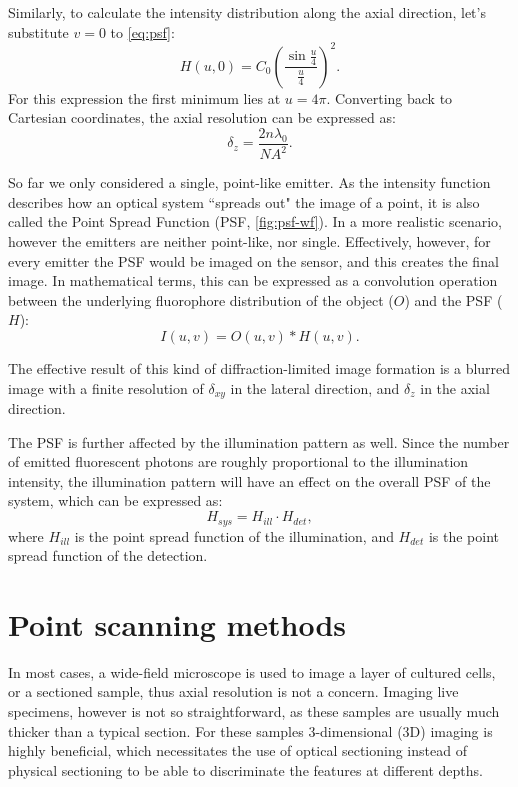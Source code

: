     Similarly, to calculate the intensity distribution along the axial direction, let's substitute $v=0$ to \autoref{eq:psf}:
    \begin{equation}
      H(u,0)=C_0\left( \frac{\sin \frac{u}{4}}{\frac{u}{4}}\right) ^2 . 
    \end{equation} 
    For this expression the first minimum lies at $u=4\pi$. Converting back to Cartesian coordinates, the axial resolution can be expressed as:
    \begin{equation}
      \delta_z = \frac{2n\lambda_0}{NA^2}.
      \label{eq:axialRes}
    \end{equation}

    So far we only considered a single, point-like emitter. As the intensity function describes how an optical system ``spreads out" the image of a point, it is also called the Point Spread Function (PSF, \autoref{fig:psf-wf}). In a more realistic scenario, however the emitters are neither point-like, nor single. Effectively, however, for every emitter the PSF would be imaged on the sensor, and this creates the final image. In mathematical terms, this can be expressed as a convolution operation between the underlying fluorophore distribution of the object ($O$) and the PSF ($H$):
    \begin{equation}
      I(u,v) = O(u,v) * H(u,v).
    \end{equation}

    The effective result of this kind of diffraction-limited image formation is a blurred image with a finite resolution of $\delta_{xy}$ in the lateral direction, and $\delta_z$ in the axial direction.

    The PSF is further affected by the illumination pattern as well. Since the number of emitted fluorescent photons are roughly proportional to the illumination intensity, the illumination pattern will have an effect on the overall PSF of the system, which can be expressed as:
    \begin{equation}
      H_{sys} = H_{ill} \cdot H_{det},
      \label{eq:systemPSF}
    \end{equation}
    where $H_{ill}$ is the point spread function of the illumination, and $H_{det}$ is the point spread function of the detection.



\section{Point scanning methods}
  In most cases, a wide-field microscope is used to image a layer of cultured cells, or a sectioned sample, thus axial resolution is not a concern. Imaging live specimens, however is not so straightforward, as these samples are usually much thicker than a typical section. For these samples 3-dimensional (3D) imaging is highly beneficial, which necessitates the use of optical sectioning instead of physical sectioning to be able to discriminate the features at different depths.


